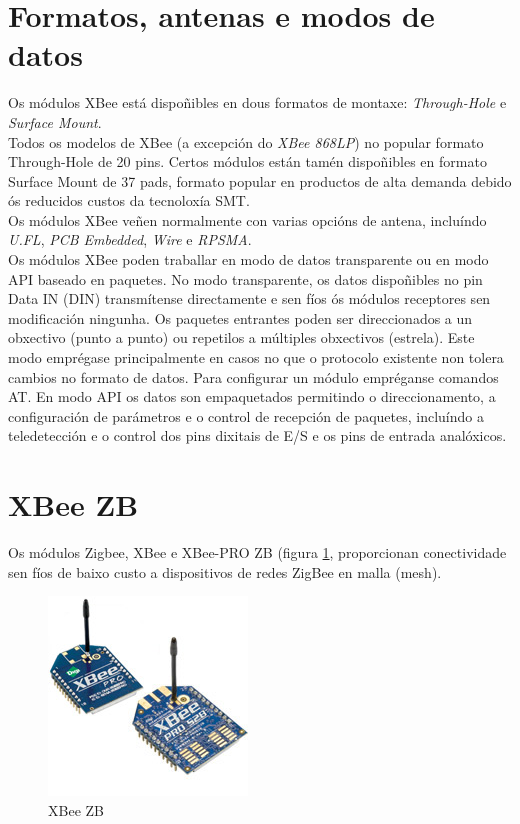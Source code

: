 \section{Formatos, antenas e modos de datos}

Os módulos XBee está dispoñibles en dous formatos de montaxe:
\textit{Through-Hole} e \textit{Surface Mount}. \\

Todos os modelos de XBee (a excepción do \textit{XBee 868LP}) no popular
formato Through-Hole de 20 pins. Certos módulos están tamén dispoñibles en
formato Surface Mount de 37 pads, formato popular en productos de alta demanda
debido ós reducidos custos da tecnoloxía SMT. \\

Os módulos XBee veñen normalmente con varias opcións de antena, incluíndo
\textit{U.FL}, \textit{PCB Embedded}, \textit{Wire} e \textit{RPSMA}. \\

Os módulos XBee poden traballar en modo de datos transparente ou en modo API
baseado en paquetes. No modo transparente, os datos dispoñibles no pin Data IN
(DIN) transmítense directamente e sen fíos ós módulos receptores sen
modificación ningunha. Os paquetes entrantes poden ser direccionados a un
obxectivo (punto a punto) ou repetilos a múltiples obxectivos (estrela). Este
modo emprégase principalmente en casos no que o protocolo existente non tolera
cambios no formato de datos. Para configurar un módulo empréganse comandos AT.
En modo API os datos son empaquetados permitindo o direccionamento, a
configuración de parámetros e o control de recepción de paquetes, incluíndo a
teledetección e o control dos pins dixitais de E/S e os pins de entrada
analóxicos.

\section{XBee ZB}

Os módulos Zigbee, XBee e XBee-PRO ZB (figura \ref{figura:XBeeZB-2},
proporcionan conectividade sen fíos de baixo custo a dispositivos de redes
ZigBee en malla (mesh).

\begin{figure}[htbp]
 \centering
 \includegraphics[scale=0.6,keepaspectratio=true]{./imagenes/xbee-zb.jpg}
 \caption{XBee ZB}
 \label{figura:XBeeZB-2}
\end{figure}

